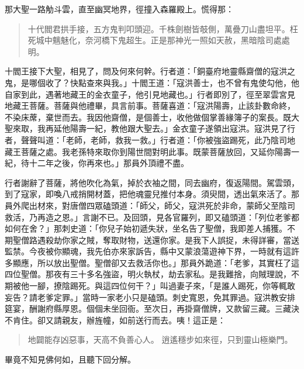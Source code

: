 那大聖一路觔斗雲，直至幽冥地界，徑撞入森羅殿上。慌得那：
\begin{quote}
十代閻君拱手接，五方鬼判叩頭迎。千株劍樹皆攲側，萬疊刀山盡坦平。枉死城中魑魅化，奈河橋下鬼超生。正是那神光一照如天赦，黑暗陰司處處明。
\end{quote}

十閻王接下大聖，相見了，問及何來何幹。行者道：「銅臺府地靈縣齋僧的寇洪之鬼，是哪個收了？快點查來與我。」十閻王道：「寇洪善士，也不曾有鬼使勾他，他自家到此，遇著地藏王的金衣童子，他引見地藏也。」行者即別了，徑至翠雲宮見地藏王菩薩。菩薩與他禮畢，具言前事。菩薩喜道：「寇洪陽壽，止該卦數命終，不染床蓆，棄世而去。我因他齋僧，是個善士，收他做個掌善緣簿子的案長。既大聖來取，我再延他陽壽一紀，教他跟大聖去。」金衣童子遂領出寇洪。寇洪見了行者，聲聲叫道：「老師，老師，救我一救。」行者道：「你被強盜踢死，此乃陰司地藏王菩薩之處。我老孫特來取你到陽世間對明此事。既蒙菩薩放回，又延你陽壽一紀，待十二年之後，你再來也。」那員外頂禮不盡。

行者謝辭了菩薩，將他吹化為氣，掉於衣袖之間，同去幽府，復返陽間。駕雲頭，到了寇家，即喚八戒捎開材蓋，把他魂靈兒推付本身。須臾間，透出氣來活了。那員外爬出材來，對唐僧四眾磕頭道：「師父，師父，寇洪死於非命，蒙師父至陰司救活，乃再造之恩。」言謝不已。及回頭，見各官羅列，即又磕頭道：「列位老爹都如何在舍？」那刺史道：「你兒子始初遞失狀，坐名告了聖僧，我即差人捕獲。不期聖僧路遇殺劫你家之賊，奪取財物，送還你家。是我下人誤捉，未得詳審，當送監禁。今夜被你顯魂，我先伯亦來家訴告，縣中又蒙浪蕩遊神下界，一時就有這許多顯應，所以放出聖僧。聖僧卻又去救活你也。」那員外跪道：「老爹，其實枉了這四位聖僧。那夜有三十多名強盜，明火執杖，劫去家私。是我難捨，向賊理說，不期被他一腳，撩陰踢死。與這四位何干？」叫過妻子來，「是誰人踢死，你等輒敢妄告？請老爹定罪。」當時一家老小只是磕頭。刺史寬恩，免其罪過。寇洪教安排筵宴，酬謝府縣厚恩。個個未坐回衙。至次日，再掛齋僧牌，又款留三藏。三藏決不肯住。卻又請親友，辦旌幢，如前送行而去。咦！這正是：
\begin{quote}
地闢能存凶惡事，天高不負善心人。
逍遙穩步如來徑，只到靈山極樂門。
\end{quote}

畢竟不知見佛何如，且聽下回分解。
